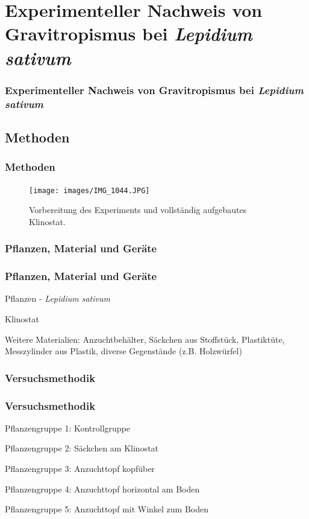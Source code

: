 \documentclass[aspectratio=169]{beamer}
\begin{document}
	\section{Experimenteller Nachweis von Gravitropismus bei \protect\emph{Lepidium sativum}}
	
	\begin{frame}
		\frametitle{Experimenteller Nachweis von Gravitropismus bei \protect\emph{Lepidium sativum}}
	\end{frame}	
	
	\subsection{Methoden}
	
	\begin{frame}
		\frametitle{Methoden}
		\begin{figure}[H]
			\centering 
			\texttt{[image: images/IMG\_1044.JPG]}
			\caption{Vorbereitung des Experiments und vollständig aufgebautes Klinostat.\label{Klinostat2}}
		\end{figure}
		
	\end{frame}
	
	\subsubsection{Pflanzen, Material und Geräte}

	\begin{frame}
		\frametitle{Pflanzen, Material und Geräte}
		Pflanzen - \protect\emph{Lepidium sativum}
		
		Klinostat
		
		Weitere Materialien: Anzuchtbehälter, Säckchen aus Stoffstück, Plastiktüte, Messzylinder aus Plastik, diverse Gegenstände (z.B. Holzwürfel) 
	\end{frame}
	
	\subsubsection{Versuchsmethodik}
	
	\begin{frame}
		\frametitle{Versuchsmethodik}
		Pflanzengruppe 1: Kontrollgruppe
		
		Pflanzengruppe 2: Säckchen am Klinostat
		
		Pflanzengruppe 3: Anzuchttopf kopfüber
		
		Pflanzengruppe 4: Anzuchttopf horizontal am Boden
		
		Pflanzengruppe 5: Anzuchttopf mit Winkel zum Boden 
		
	\end{frame}
	
\end{document}
